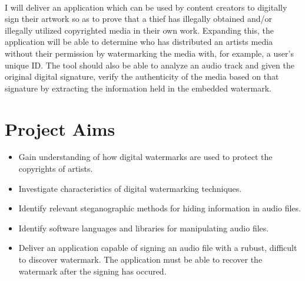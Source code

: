 \documentclass{article}
\begin{document}
	\paragraph{}
	I will deliver an application which can be used by content creators to digitally sign their artwork so as to prove that a thief has illegally obtained and/or illegally utilized copyrighted media in their own work. Expanding this, the application will be able to determine who has distributed an artists media without their permission by watermarking the media with, for example, a user's unique ID. The tool should also be able to analyze an audio track and given the original digital signature, verify the authenticity of the media based on that signature by extracting the information held in the embedded watermark.
	
\newpage
	
	\section{Project Aims}
	\begin{itemize}
		\item Gain understanding of how digital watermarks are used to protect the copyrights of artists.
  		\item Investigate characteristics of digital watermarking techniques.
		\item Identify relevant steganographic methods for hiding information in audio files.
		\item Identify software languages and libraries for manipulating audio files.
		\item Deliver an application capable of signing an audio file with a rubust, difficult to discover watermark. The application must be able to recover the watermark after the signing has occured.
	\end{itemize}
	
\end{document}
